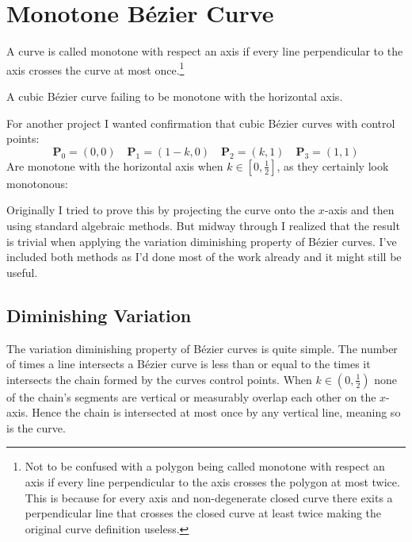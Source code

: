 
\section{Monotone Bézier Curve}
A curve is called monotone with respect an axis if every line perpendicular to the axis crosses the curve at most once.\footnote{
Not to be confused with a polygon being called monotone with respect an axis if every line perpendicular to the axis crosses the polygon at most twice.
This is because for every axis and non-degenerate closed curve there exits a perpendicular line that crosses the closed curve at least twice making the original curve definition useless.}
\begin{center}

A cubic Bézier curve failing to be monotone with the horizontal axis.
\end{center}
For another project I wanted confirmation that cubic Bézier curves with control points:
\[\mathbf{P}_0=(0,0)\quad\mathbf{P}_1=(1-k,0)\quad\mathbf{P}_2=(k,1)\quad\mathbf{P}_3=(1,1)\]
Are monotone with the horizontal axis when $k\in[0,\frac{1}{2}]$,
as they certainly look monotonous:
\begin{center}
\end{center}
Originally I tried to prove this by projecting the curve onto the $x$-axis and then using standard algebraic methods.
But midway through I realized that the result is trivial when applying the variation diminishing property of Bézier curves.
I've included both methods as I'd done most of the work already and it might still be useful.

\subsection{Diminishing Variation}
The variation diminishing property of Bézier curves is quite simple.
The number of times a line intersects a Bézier curve is less than or equal to the times it intersects the chain formed by the curves control points.
When $k\in (0,\frac{1}{2})$ none of the chain's segments are vertical or measurably overlap each other on the $x$-axis.
Hence the chain is intersected at most once by any vertical line,
meaning so is the curve.
\\

